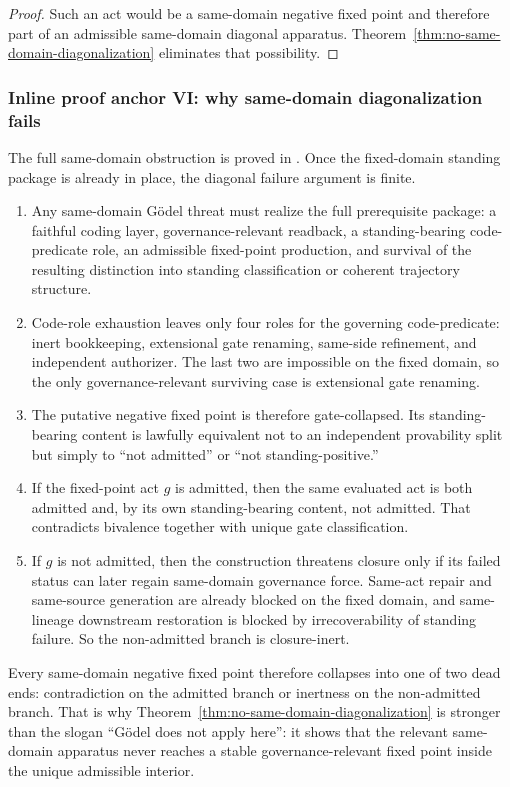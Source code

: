 \begin{proof}
Such an act would be a same-domain negative fixed point and therefore part of an admissible same-domain diagonal apparatus. Theorem~\ref{thm:no-same-domain-diagonalization} eliminates that possibility.
\end{proof}


\subsubsection*{Inline proof anchor VI: why same-domain diagonalization fails}

The full same-domain obstruction is proved in \noninstgodeldoc{} \cite{MaleyNonInst}. Once the fixed-domain standing package is already in place, the diagonal failure argument is finite.
\begin{enumerate}
  \item Any same-domain G\"odel threat must realize the full prerequisite package: a faithful coding layer, governance-relevant readback, a standing-bearing code-predicate role, an admissible fixed-point production, and survival of the resulting distinction into standing classification or coherent trajectory structure.
  \item Code-role exhaustion leaves only four roles for the governing code-predicate: inert bookkeeping, extensional gate renaming, same-side refinement, and independent authorizer. The last two are impossible on the fixed domain, so the only governance-relevant surviving case is extensional gate renaming.
  \item The putative negative fixed point is therefore gate-collapsed. Its standing-bearing content is lawfully equivalent not to an independent provability split but simply to ``not admitted'' or ``not standing-positive.''
  \item If the fixed-point act $g$ is admitted, then the same evaluated act is both admitted and, by its own standing-bearing content, not admitted. That contradicts bivalence together with unique gate classification.
  \item If $g$ is not admitted, then the construction threatens closure only if its failed status can later regain same-domain governance force. Same-act repair and same-source generation are already blocked on the fixed domain, and same-lineage downstream restoration is blocked by irrecoverability of standing failure. So the non-admitted branch is closure-inert.
\end{enumerate}
Every same-domain negative fixed point therefore collapses into one of two dead ends: contradiction on the admitted branch or inertness on the non-admitted branch. That is why Theorem~\ref{thm:no-same-domain-diagonalization} is stronger than the slogan ``G\"odel does not apply here'': it shows that the relevant same-domain apparatus never reaches a stable governance-relevant fixed point inside the unique admissible interior.


